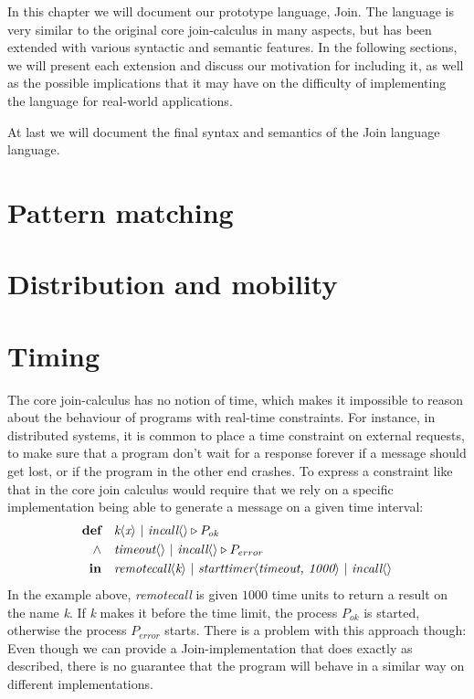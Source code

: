 In this chapter we will document our prototype language, Join.  The language is
very similar to the original core join-calculus in many aspects, but has been
extended with various syntactic and semantic features. In the following
sections, we will present each extension and discuss our motivation for
including it, as well as the possible implications that it may have on the
difficulty of implementing the language for real-world applications.

At last we will document the final syntax and semantics of the Join language
language.


\section{Pattern matching}

\section{Distribution and mobility}

\section{Timing}

The core join-calculus has no notion of time, which makes it impossible to
reason about the behaviour of programs with real-time constraints.
For instance, in distributed systems, it is common to place a time constraint
on external requests, to make sure that a program don't wait for a response
forever if a message should get lost, or if the program in the other end
crashes. To express a constraint like that in the core join calculus would
require that we rely on a specific implementation being able to generate a
message on a given time interval:
\begin{align*}
  \textbf{def}\quad & \S k<x> ~|~ \S incall<> \triangleright P_{ok} \\
  \land\quad & \S timeout<> ~|~ \S incall<> \triangleright P_{error} \\
  \textbf{in}\quad & \S remotecall<k> ~|~ \S starttimer<timeout, 1000> ~|~ \S incall<>
\end{align*}
In the example above, \emph{remotecall} is given $1000$ time units to return a
result on the name \emph{k}. If \emph{k} makes it before the time limit, the
process $P_{ok}$ is started, otherwise the process $P_{error}$ starts.
There is a problem with this approach though: Even though we can provide a
Join-implementation that does exactly as described, there is no guarantee that
the program will behave in a similar way on different implementations.

